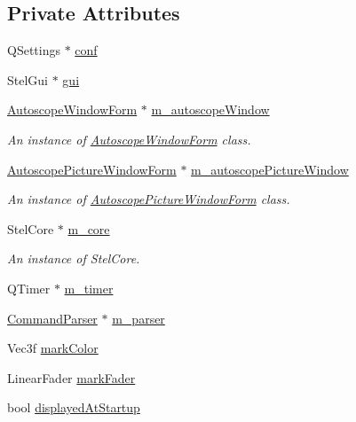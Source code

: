 \subsection*{Private Attributes}
\begin{DoxyCompactItemize}
\item 
Q\+Settings $\ast$ \hyperlink{class_autoscope_a6a17eb00225f765623844eaa9f80e71e}{conf}
\item 
Stel\+Gui $\ast$ \hyperlink{class_autoscope_a90c44f576ab3acd74da3af3ad8162ca7}{gui}
\item 
\hyperlink{class_autoscope_window_form}{Autoscope\+Window\+Form} $\ast$ \hyperlink{class_autoscope_a33104164061c784c65c1f94bfde26423}{m\+\_\+autoscope\+Window}
\begin{DoxyCompactList}\small\item\em An instance of \hyperlink{class_autoscope_window_form}{Autoscope\+Window\+Form} class. \end{DoxyCompactList}\item 
\hyperlink{class_autoscope_picture_window_form}{Autoscope\+Picture\+Window\+Form} $\ast$ \hyperlink{class_autoscope_a75a50ab46f25c007b9a86d3776385fc6}{m\+\_\+autoscope\+Picture\+Window}
\begin{DoxyCompactList}\small\item\em An instance of \hyperlink{class_autoscope_picture_window_form}{Autoscope\+Picture\+Window\+Form} class. \end{DoxyCompactList}\item 
Stel\+Core $\ast$ \hyperlink{class_autoscope_aa333cfe8f256f5698c686423cad648c2}{m\+\_\+core}
\begin{DoxyCompactList}\small\item\em An instance of Stel\+Core. \end{DoxyCompactList}\item 
Q\+Timer $\ast$ \hyperlink{class_autoscope_a6d86ef1f5ea17f5175009a15004b2459}{m\+\_\+timer}
\item 
\hyperlink{class_command_parser}{Command\+Parser} $\ast$ \hyperlink{class_autoscope_ab4a9bf62ccbcf24b4a6e3752cff9f090}{m\+\_\+parser}
\item 
Vec3f \hyperlink{class_autoscope_a58327daadc555f31fc62b6db85e3fcfa}{mark\+Color}
\item 
Linear\+Fader \hyperlink{class_autoscope_a9c141894e06ed64f4131f1071e9e18af}{mark\+Fader}
\item 
bool \hyperlink{class_autoscope_a8c066a069946815c05fe7d32b13211d3}{displayed\+At\+Startup}
\item 

\end{DoxyCompactItemize}
